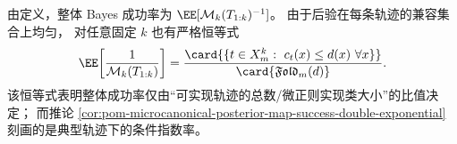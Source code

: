 \begin{remark}\label{rem:pom-microcanonical-global-vs-typical-bayes-success}
由定义，整体 Bayes 成功率为 \(\EE[\mathcal{M}_k(T_{1:k})^{-1}]\)。
由于后验在每条轨迹的兼容集合上均匀，
对任意固定 \(k\) 也有严格恒等式
\[
\EE\!\left[\frac{1}{\mathcal{M}_k(T_{1:k})}\right]
=\frac{\card{\{t\in X_m^k:\ c_t(x)\le d(x)\ \forall x\}}}{\card{\mathfrak{Fold}_m(d)}}.
\]
该恒等式表明整体成功率仅由“可实现轨迹的总数/微正则实现类大小”的比值决定；
而推论 \ref{cor:pom-microcanonical-posterior-map-success-double-exponential} 刻画的是典型轨迹下的条件指数率。
\end{remark}

\endinput
